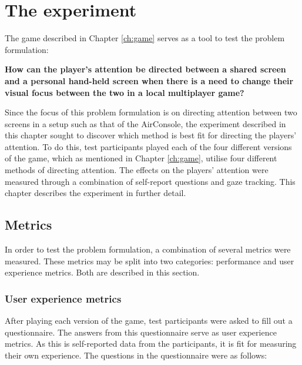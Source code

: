 \chapter{The experiment}\label{ch:experiment}
The game described in Chapter \ref{ch:game} serves as a tool to test the problem formulation:

\begin{changemargin}{1cm}{1cm}
\textbf{How can the player’s attention be directed between a shared screen and a personal hand-held screen when there is a need to change their visual focus between the two in a local multiplayer game?}
\end{changemargin}

Since the focus of this problem formulation is on directing attention between two screens in a setup such as that of the AirConsole, the experiment described in this chapter sought to discover which method is best fit for directing the players' attention. To do this, test participants played each of the four different versions of the game, which as mentioned in Chapter \ref{ch:game}, utilise four different methods of directing attention. The effects on the players' attention were measured through a combination of self-report questions and gaze tracking. This chapter describes the experiment in further detail.

\section{Metrics}
In order to test the problem formulation, a combination of several metrics were measured. These metrics may be split into two categories: performance and user experience metrics. Both are described in this section.

\subsection{User experience metrics}\label{subsec:user_experience_metrics}
After playing each version of the game, test participants were asked to fill out a questionnaire. The answers from this questionnaire serve as user experience metrics. As this is self-reported data from the participants, it is fit for measuring their own experience. The questions in the questionnaire were as follows:

